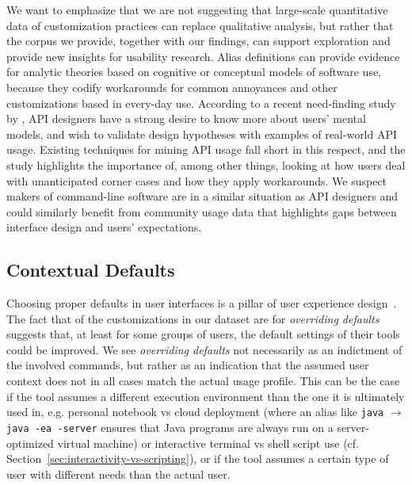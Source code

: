 \documentclass[smallextended,natbib]{svjour3}
\newcommand{\per}[1]{\numprint[\%]{#1}}
\newcommand{\alias}[2]{{\texttt{#1} $\rightarrow$ \texttt{#2}}}
\begin{document}
We want to emphasize that we are not suggesting that large-scale quantitative data of customization practices can replace qualitative analysis, but rather that the corpus we provide, together with our findings, can support exploration and provide new insights for usability research.
Alias definitions can provide evidence for analytic theories based on cognitive or conceptual models of software use, because they codify workarounds for common annoyances and other customizations based in every-day use.
According to a recent need-finding study by \cite{zhang:20}, API designers have a strong desire to know more about users' mental models, and wish to validate design hypotheses with examples of real-world API usage.
Existing techniques for mining API usage fall short in this respect, and the study highlights the importance of, among other things, looking at how users deal with unanticipated corner cases and how they apply workarounds.
We suspect makers of command-line software are in a similar situation as API designers and could similarly benefit from community usage data that highlights gaps between interface design and users' expectations.

\subsection{Contextual Defaults}
\label{sec:contextual-defaults}

Choosing proper defaults in user interfaces is a pillar of user experience design~\citep{nielsen2005power}.
The fact that \per{14.48} of the customizations in our dataset are for \emph{overriding defaults} suggests that, at least for some groups of users, the default settings of their tools could be improved.
We see \emph{overriding defaults} not necessarily as an indictment of the involved commands, but rather as an indication that the assumed user context does not in all cases match the actual usage profile.
This can be the case if the tool assumes a different execution environment than the one it is ultimately used in, e.g. personal notebook vs cloud deployment (where an alias like \alias{java}{java -ea -server} ensures that Java programs are always run on a server-optimized virtual machine) or interactive terminal vs shell script use (cf. Section~\ref{sec:interactivity-vs-scripting}), or if the tool assumes a certain type of user with different needs than the actual user.
\end{document}
